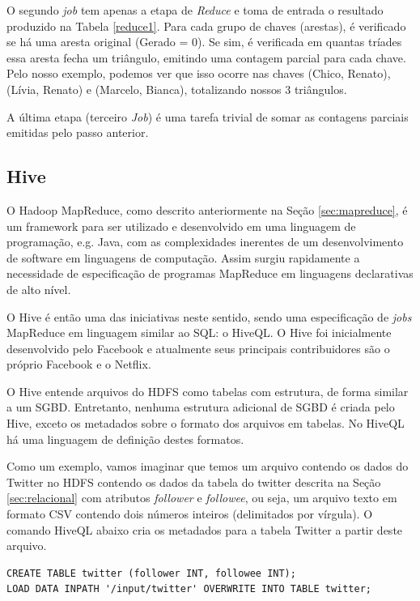 O segundo \textit{job} tem apenas a etapa de \textit{Reduce} e toma de entrada o resultado produzido na 
Tabela \ref{reduce1}. Para cada grupo de chaves (arestas), é verificado se há uma aresta original 
(Gerado = 0). Se sim, é verificada em quantas tríades essa aresta fecha um triângulo, emitindo uma 
contagem parcial para cada chave. Pelo nosso exemplo, podemos ver que isso ocorre nas chaves 
(Chico, Renato), (Lívia, Renato) e (Marcelo, Bianca), totalizando nossos 3 triângulos.

A última etapa (terceiro \textit{Job}) é uma tarefa trivial de somar as contagens parciais emitidas 
pelo passo anterior.

\subsection{Hive}

O Hadoop MapReduce, como descrito anteriormente na Seção \ref{sec:mapreduce}, é um framework para ser 
utilizado e desenvolvido em uma linguagem de programação, e.g. Java, com as complexidades inerentes de 
um desenvolvimento de software em linguagens de computação. Assim surgiu rapidamente a necessidade de 
especificação de programas MapReduce em linguagens declarativas de alto nível.

O Hive \cite{thusoo2009hive} é então uma das iniciativas neste sentido, sendo uma especificação de 
\textit{jobs} MapReduce em linguagem similar ao SQL: o HiveQL. O Hive foi inicialmente desenvolvido 
pelo Facebook e atualmente seus principais contribuidores são o próprio Facebook e o Netflix.

O Hive entende arquivos do HDFS como tabelas com estrutura, de forma similar a um SGBD. Entretanto, 
nenhuma estrutura adicional de SGBD é criada pelo Hive, exceto os metadados sobre o formato dos arquivos 
em tabelas. No HiveQL há uma linguagem de definição destes formatos.

Como um exemplo, vamos imaginar que temos um arquivo contendo os dados do Twitter no HDFS contendo 
os dados da tabela do twitter descrita na Seção \ref{sec:relacional} com atributos \textit{follower} e
\textit{followee}, ou seja, um arquivo texto em formato CSV contendo dois números inteiros (delimitados
por vírgula). O comando HiveQL abaixo cria os metadados para a tabela Twitter a partir deste arquivo.

\begin{verbatim}
CREATE TABLE twitter (follower INT, followee INT);
LOAD DATA INPATH '/input/twitter' OVERWRITE INTO TABLE twitter;
\end{verbatim}

